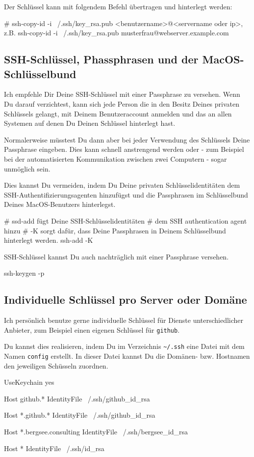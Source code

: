 \documentclass[]{article}
\newcommand{\code}[1]{\texttt{#1}}
\begin{document}
Der Schlüssel kann mit folgendem Befehl übertragen und hinterlegt werden:
\begin{bashcode}
# ssh-copy-id -i ~/.ssh/key_rsa.pub <benutzername>@<servername oder ip>, z.B.
ssh-copy-id -i ~/.ssh/key_rsa.pub musterfrau@webserver.example.com
\end{bashcode}

\subsection{SSH-Schlüssel, Phassphrasen und der MacOS-Schlüsselbund}
Ich empfehle Dir Deine SSH-Schlüssel mit einer Passphrase zu versehen. Wenn Du darauf verzichtest, kann sich jede Person die in den Besitz Deines privaten Schlüssels gelangt, mit Deinem Benutzeraccount anmelden und das an allen Systemen auf denen Du Deinen Schlüssel hinterlegt hast.

Normalerweise müsstest Du dann aber bei jeder Verwendung des Schlüssels Deine Passphrase eingeben. Dies kann schnell anstrengend werden oder - zum Beispiel bei der automatisierten Kommunikation zwischen zwei Computern - sogar unmöglich sein.

Dies kannst Du vermeiden, indem Du Deine privaten Schlüsselidentitäten dem SSH-Authentifizierungsagenten hinzufügst und die Passphrasen im Schlüsselbund Deines MacOS-Benutzers hinterlegst. 

\begin{bashcode}
# ssd-add fügt Deine SSH-Schlüsselidentitäten
# dem SSH authentication agent hinzu
# -K sorgt dafür, dass Deine Passphrasen in Deinem Schlüsselbund hinterlegt werden.
ssh-add -K
\end{bashcode}

SSH-Schlüssel kannst Du auch nachträglich mit einer Passphrase versehen.
\begin{bashcode}
ssh-keygen -p
\end{bashcode}

\subsection{Individuelle Schlüssel pro Server oder Domäne}
Ich persönlich benutze gerne individuelle Schlüssel für Dienste unterschiedlicher Anbieter, zum Beispiel einen eigenen Schlüssel für \code{github}.

Du kannst dies realisieren, indem Du im Verzeichnis \code{\~\//.ssh} eine Datei mit dem Namen \code{config} erstellt. In dieser Datei kannst Du die Domänen- bzw. Hostnamen den jeweiligen Schüsseln zuordnen. 
\begin{bashcode}
UseKeychain yes
	
Host github.*
IdentityFile ~/.ssh/github_id_rsa
	
Host *.github.*
IdentityFile ~/.ssh/github_id_rsa
	
Host *.bergsee.consulting
IdentityFile ~/.ssh/bergsee_id_rsa
	
Host *
IdentityFile ~/.ssh/id_rsa
\end{bashcode}
\end{document}
